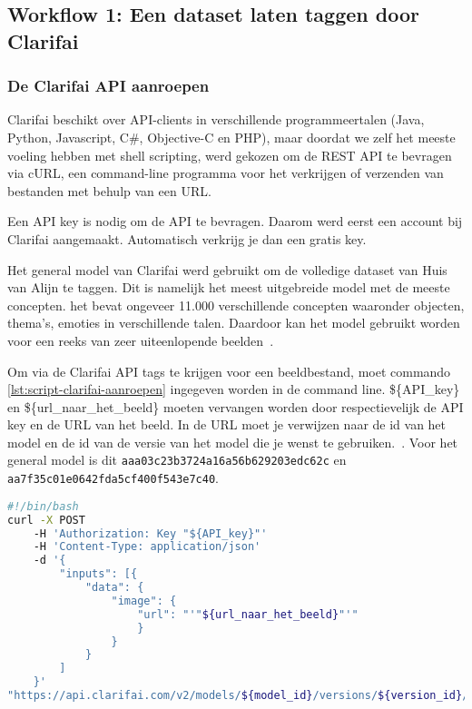 \subsection{Workflow 1: Een dataset laten taggen door Clarifai}
\label{subsec:workflow1}

\subsubsection{De Clarifai API aanroepen}
\label{(subsubsec:clarifai-aanroepen)}

Clarifai beschikt over API-clients in verschillende programmeertalen (Java, Python, Javascript, C\#, Objective-C en PHP), maar doordat we zelf het meeste voeling hebben met shell scripting, werd gekozen om de REST API te bevragen via cURL, een command-line programma voor het verkrijgen of verzenden van bestanden met behulp van  een URL.

Een API key is nodig om de API te bevragen. Daarom werd eerst een account bij Clarifai aangemaakt. Automatisch verkrijg je dan een gratis key. 

Het general model van Clarifai werd gebruikt om de volledige dataset van Huis van Alijn te taggen. Dit is namelijk het meest uitgebreide model met de meeste concepten. het bevat ongeveer 11.000 verschillende concepten waaronder objecten, thema's, emoties in verschillende talen. Daardoor kan het model gebruikt worden voor een reeks van zeer uiteenlopende beelden~\autocite{ClarifaiGeneral}.

Om via de Clarifai API tags te krijgen voor een beeldbestand, moet commando \ref{lst:script-clarifai-aanroepen} ingegeven worden in de command line. \$\{API\_key\} en \$\{url\_naar\_het\_beeld\} moeten vervangen worden door respectievelijk de API key en de URL van het beeld. In de URL moet je verwijzen naar de id van het model en de id van de versie van het model die je wenst te gebruiken.~\autocite{ClarifaiAPI}. Voor het general model is dit \texttt{aaa03c23b3724a16a56b629203edc62c} en \texttt{aa7f35c01e0642fda5cf400f543e7c40}.

\begin{lstlisting}[language=bash,caption={bash commando om een beeld door Clarifai te laten taggen.}, label=lst:script-clarifai-aanroepen]
#!/bin/bash
curl -X POST
    -H 'Authorization: Key "${API_key}"'
    -H 'Content-Type: application/json'
    -d '{
        "inputs": [{
            "data": {
                "image": { 
                    "url": "'"${url_naar_het_beeld}"'"
                    }
                }
            }
        ]
    }'
"https://api.clarifai.com/v2/models/${model_id}/versions/${version_id}/outputs"
\end{lstlisting}

